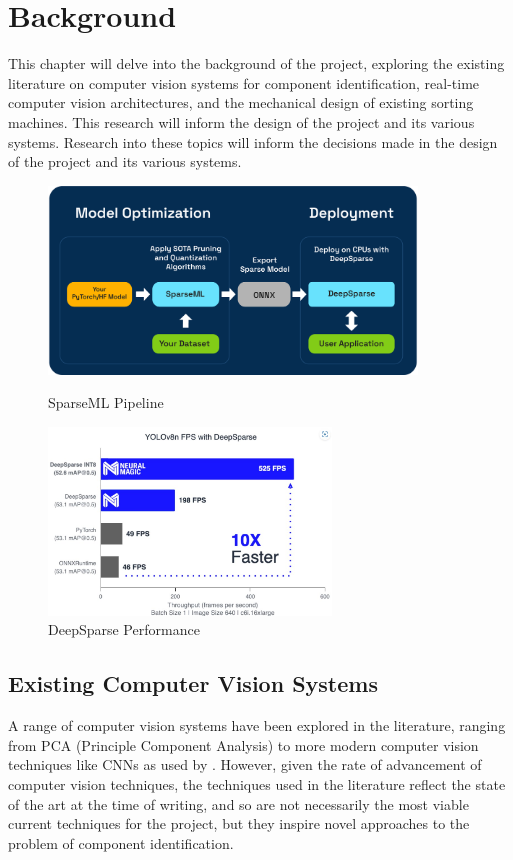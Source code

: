 \section{Background}
\label{sec:background}
This chapter will delve into the background of the project, exploring the existing literature on computer vision systems for component identification, real-time computer vision architectures, and the mechanical design of existing sorting machines. This research will inform the design of the project and its various systems.
Research into these topics will inform the decisions made in the design of the project and its various systems.

\begin{figure}[t]
  \begin{minipage}[t]{0.49\textwidth}
    \centering
    \includegraphics[width=\textwidth,height=5cm]{imgs/articles/sparseml-workflow.png}
    \caption{SparseML Pipeline \cite{sparseml}}
  \end{minipage}
  \hfill
  \begin{minipage}[t]{0.49\textwidth}
      \centering
      \includegraphics[width=\textwidth,height=5cm]{imgs/articles/yoloperf.jpg}
      \caption{DeepSparse Performance \cite{neuralmagic}}
      \end{minipage}
\end{figure}

\subsection{Existing Computer Vision Systems}
A range of computer vision systems have been explored in the literature, ranging from PCA (Principle Component Analysis) \citet{Dhenge2013MechanicalNS} to more modern computer vision techniques like CNNs as used by \citet{Xu2020,s22239079}. However, given the rate of advancement of computer vision
techniques, the techniques used in the literature reflect the state of the art at the time of writing, and so are not necessarily the most viable current techniques for the project, but they inspire novel approaches to the problem of component identification.

